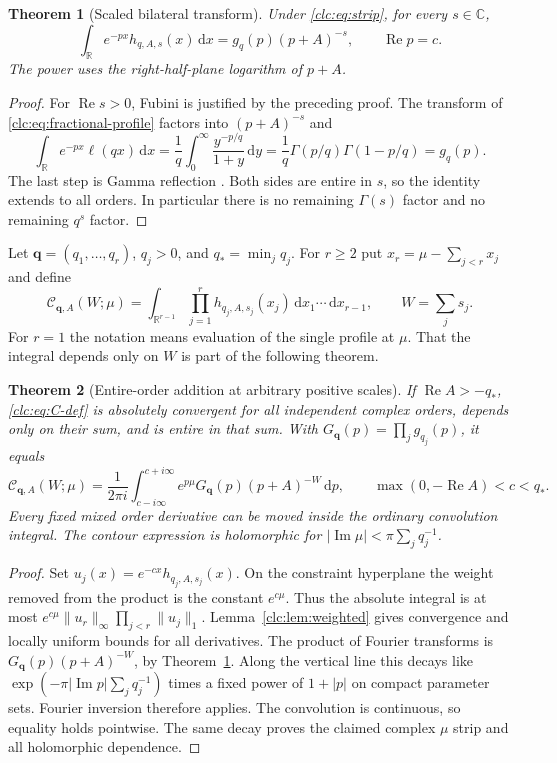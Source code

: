 \documentclass[11pt,a4paper]{article}
\numberwithin{equation}{section}
\newtheorem{theorem}{Theorem}[section]
\theoremstyle{definition}\newtheorem{definition}[theorem]{Definition}
\theoremstyle{remark}\newtheorem{remark}[theorem]{Remark}
\DeclareMathOperator{\Rea}{Re}
\DeclareMathOperator{\Ima}{Im}
\newcommand{\dd}{\,\mathrm d}
\newcommand{\C}{\mathbb C}\newcommand{\R}{\mathbb R}\newcommand{\N}{\mathbb N}
\newcommand{\bq}{\boldsymbol q}\newcommand{\bs}{\boldsymbol s}
\newcommand{\CC}{\mathcal C}\newcommand{\UU}{\mathcal U}\newcommand{\EE}{\mathcal E}
\begin{document}
\begin{theorem}[Scaled bilateral transform]\label{clc:thm:transform}
Under \eqref{clc:eq:strip}, for every $s\in\C$,
\begin{equation}\label{clc:eq:transform}
 \int_\R e^{-px}h_{q,A,s}(x)\dd x
 =g_q(p)(p+A)^{-s},\qquad \Rea p=c.
\end{equation}
The power uses the right-half-plane logarithm of $p+A$.
\end{theorem}
\begin{proof}
For $\Rea s>0$, Fubini is justified by the preceding proof. The transform
of \eqref{clc:eq:fractional-profile} factors into $(p+A)^{-s}$ and
\[
 \int_\R e^{-px}\ell(qx)\dd x
 =\frac1q\int_0^\infty\frac{y^{-p/q}}{1+y}\dd y
 =\frac1q\Gamma(p/q)\Gamma(1-p/q)=g_q(p).
\]
The last step is Gamma reflection \cite{DLMF5}. Both sides are entire in
$s$, so the identity extends to all orders. In particular there is no
remaining $\Gamma(s)$ factor and no remaining $q^s$ factor.
\end{proof}

Let $\bq=(q_1,\ldots,q_r)$, $q_j>0$, and $q_*=\min_jq_j$.
For $r\ge2$ put $x_r=\mu-\sum_{j<r}x_j$ and define
\begin{equation}\label{clc:eq:C-def}
 \CC_{\bq,A}(W;\mu)=
 \int_{\R^{r-1}}\prod_{j=1}^r h_{q_j,A,s_j}(x_j)
           \dd x_1\cdots\dd x_{r-1},\qquad W=\sum_js_j.
\end{equation}
For $r=1$ the notation means evaluation of the single profile at $\mu$.
That the integral depends only on $W$ is part of the following theorem.

\begin{theorem}[Entire-order addition at arbitrary positive scales]
\label{clc:thm:addition}
If $\Rea A>-q_*$, \eqref{clc:eq:C-def} is absolutely convergent for all
independent complex orders, depends only on their sum, and is entire in
that sum. With
$G_{\bq}(p)=\prod_jg_{q_j}(p)$, it equals
\begin{equation}\label{clc:eq:C-contour}
 \CC_{\bq,A}(W;\mu)=\frac1{2\pi i}
 \int_{c-i\infty}^{c+i\infty}
 e^{p\mu}G_{\bq}(p)(p+A)^{-W}\dd p,
 \qquad \max(0,-\Rea A)<c<q_*.
\end{equation}
Every fixed mixed order derivative can be moved inside the ordinary
convolution integral. The contour expression is holomorphic for
$|\Ima\mu|<\pi\sum_jq_j^{-1}$.
\end{theorem}
\begin{proof}
Set $u_j(x)=e^{-cx}h_{q_j,A,s_j}(x)$. On the constraint hyperplane the
weight removed from the product is the constant $e^{c\mu}$. Thus the
absolute integral is at most
$e^{c\mu}\|u_r\|_\infty\prod_{j<r}\|u_j\|_1$.
Lemma~\ref{clc:lem:weighted} gives convergence and locally uniform bounds
for all derivatives. The product of Fourier transforms is
$G_{\bq}(p)(p+A)^{-W}$, by Theorem~\ref{clc:thm:transform}.
Along the vertical line this decays like
$\exp(-\pi|\Ima p|\sum_jq_j^{-1})$ times a fixed power of $1+|p|$
on compact parameter sets. Fourier inversion therefore applies. The
convolution is continuous, so equality holds pointwise. The same decay
proves the claimed complex $\mu$ strip and all holomorphic dependence.
\end{proof}
\end{document}
